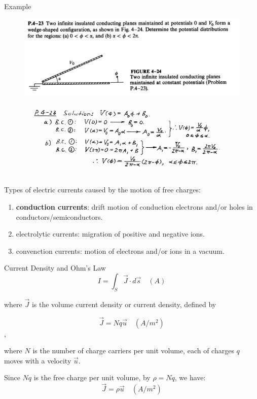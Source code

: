 \documentclass[xcolor={dvipsnames}]{beamer}
\begin{document}
\begin{frame}{Example}
\begin{figure}
	\centering
	\includegraphics[width=0.8\linewidth]{5_16.png}
\end{figure}
\pause
\begin{figure}
	\centering
	\includegraphics[width=0.8\linewidth]{5_17.png}
\end{figure}
\end{frame}
\begin{frame}
Types of electric currents caused by the motion of free charges:
\begin{enumerate}
  \item \textbf{conduction currents}: drift motion of conduction electrons and/or holes in conductors/semiconductors.
  \item electrolytic currents: migration of positive and negative ions.
  \item convenction currents: motion of electrons and/or ions in a vacuum.
\end{enumerate}
\end{frame}
\begin{frame}{Current Density and Ohm's Law}
$$I = \int_S \vec{J}\cdot d\vec{s}\quad (A)$$

where $\vec{J}$ is the volume current density or current density, defined by 

$$\vec{J} = Nq\vec{u}\quad (A/m^2)$$,

where $N$ is the number of charge carriers per unit volume, each of charges $q$ moves with a velocity $\vec{u}$.

Since $Nq$ is the free charge per unit volume, by $\rho = Nq$, we have:
$$
\vec{J} = \rho \vec{u}\quad (A/m^2)
$$
\end{frame}
\end{document}
